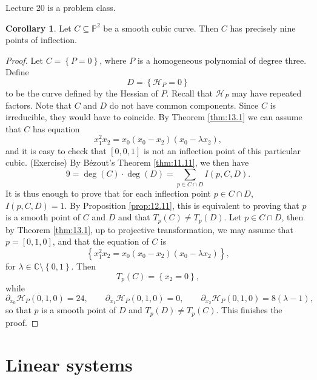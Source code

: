 \documentclass{article}
\newcommand{\C}{\mathbb{C}}
\renewcommand{\P}{\mathbb{P}}
\renewcommand{\H}{\mathcal{H}}
\newcommand{\rb}[1]{\left( #1 \right)}
\renewcommand{\sb}[1]{\left[ #1 \right]}
\newcommand{\cb}[1]{\left\{ #1 \right\}}
\theoremstyle{definition}\newtheorem{definition}{Definition}[section]
\theoremstyle{definition}\newtheorem{notation}[definition]{Notation}
\theoremstyle{definition}\newtheorem{remark}[definition]{Remark}
\theoremstyle{definition}\newtheorem{example1}[definition]{Example}
\theoremstyle{definition}\newtheorem{fact}{Fact}
\theoremstyle{definition}\newtheorem{exercise}{Exercise}
\theoremstyle{definition}\newtheorem*{example2}{Example}
\newtheorem{corollary}[definition]{Corollary}
\begin{document}

Lecture 20 is a problem class.


\begin{corollary}
Let $ C \subseteq \P^2 $ be a smooth cubic curve. Then $ C $ has precisely nine points of inflection.
\end{corollary}

\begin{proof}
Let $ C = \cb{P = 0} $, where $ P $ is a homogeneous polynomial of degree three. Define
$$ D = \cb{\H_P = 0} $$
to be the curve defined by the Hessian of $ P $. Recall that $ \H_P $ may have repeated factors. Note that $ C $ and $ D $ do not have common components. Since $ C $ is irreducible, they would have to coincide. By Theorem \ref{thm:13.1} we can assume that $ C $ has equation
$$ x_1^2x_2 = x_0\rb{x_0 - x_2}\rb{x_0 - \lambda x_2}, $$
and it is easy to check that $ \sb{0, 0, 1} $ is not an inflection point of this particular cubic. (Exercise) By B\'ezout's Theorem \ref{thm:11.11}, we then have
$$ 9 = \deg\rb{C} \cdot \deg\rb{D} = \sum_{p \in C \cap D} I\rb{p, C, D}. $$
It is thus enough to prove that for each inflection point $ p \in C \cap D $, $ I\rb{p, C, D} = 1 $. By Proposition \ref{prop:12.11}, this is equivalent to proving that $ p $ is a smooth point of $ C $ and $ D $ and that $ T_p\rb{C} \ne T_p\rb{D} $. Let $ p \in C \cap D $, then by Theorem \ref{thm:13.1}, up to projective transformation, we may assume that $ p = \sb{0, 1, 0} $, and that the equation of $ C $ is
$$ \cb{x_1^2x_2 = x_0\rb{x_0 - x_2}\rb{x_0 - \lambda x_2}}, $$
for $ \lambda \in \C \setminus \cb{0, 1} $. Then
$$ T_p\rb{C} = \cb{x_2 = 0}, $$
while
$$ \partial_{x_0}\H_P\rb{0, 1, 0} = 24, \qquad \partial_{x_1}\H_P\rb{0, 1, 0} = 0, \qquad \partial_{x_2}\H_P\rb{0, 1, 0} = 8\rb{\lambda - 1}, $$
so that $ p $ is a smooth point of $ D $ and $ T_p\rb{D} \ne T_p\rb{C} $. This finishes the proof.
\end{proof}

\pagebreak

\section{Linear systems}
\end{document}
